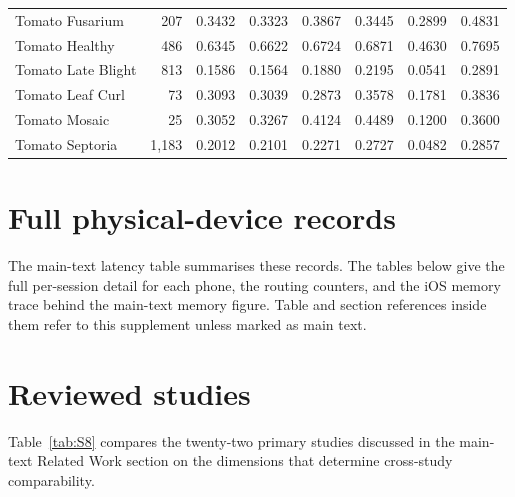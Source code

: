 \documentclass[preprint,12pt,authoryear]{elsarticle}
\newcommand{\tabletail}{\par\addvspace{\bigskipamount}}
\begin{document}
\begin{center}
\begin{tabular}{l r r r r r r r}
Tomato Fusarium & 207 & 0.3432 & 0.3323 & 0.3867 & 0.3445 & 0.2899 & 0.4831 \\
Tomato Healthy & 486 & 0.6345 & 0.6622 & 0.6724 & 0.6871 & 0.4630 & 0.7695 \\
Tomato Late Blight & 813 & 0.1586 & 0.1564 & 0.1880 & 0.2195 & 0.0541 & 0.2891 \\
Tomato Leaf Curl & 73 & 0.3093 & 0.3039 & 0.2873 & 0.3578 & 0.1781 & 0.3836 \\
Tomato Mosaic & 25 & 0.3052 & 0.3267 & 0.4124 & 0.4489 & 0.1200 & 0.3600 \\
Tomato Septoria & 1{,}183 & 0.2012 & 0.2101 & 0.2271 & 0.2727 & 0.0482 & 0.2857 \\
\bottomrule
\end{tabular}
\end{center}
\tabletail

\section{Full physical-device records}
\label{sup:devicetables}

The main-text latency table summarises these records. The tables below give
the full per-session detail for each phone, the routing counters, and the iOS
memory trace behind the main-text memory figure. Table and section references
inside them refer to this supplement unless marked as main text.






\section{Reviewed studies}
\label{sup:literature}

Table~\ref{tab:S8} compares the twenty-two primary studies discussed in the
main-text Related Work section on the dimensions that determine cross-study
comparability.


\end{document}
